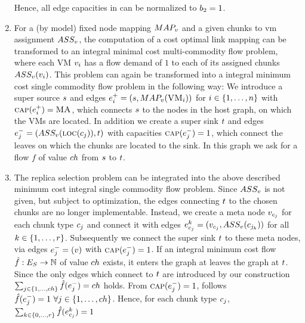 \begin{enumerate}
Hence, all edge capacities in can be normalized to $b_2 = 1$.
\item For a (by model) fixed node mapping $MAP_v$ and a given chunks to 
vm assignment $ASS_v$, the computation of a cost 
optimal link mapping can be transformed to an integral minimal cost multi-commodity 
flow problem, where each VM $v_i$ has a flow demand of $1$ to each 
of its assigned chunks $ASS_v(v_i)$. This problem can 
again be transformed into a integral minimum cost single commodity flow problem 
in the following way: 
We introduce a 
super source $s$ and edges $e_i^+ = (s, 
MAP_v(\textsc{VM}_i))$ for 
$i \in \{1,\dots,n\}$ with $\textsc{cap}(e_i^+) = \textsc{MA}$, 
which connects $s$ 
to the nodes in the host graph, on which the VMs are located. 
In addition we create a super sink $t$ and edges $e_j^- = 
(ASS_v(\textsc{loc}(c_j)), t)$ with capacities 
$\textsc{cap}(e_j^-) = 1$, which connect the leaves on which the 
chunks are located to the sink. In this graph we ask for a flow $f$ 
of value $ch$ from $s$ to $t$. 
\item The replica selection problem can be integrated into the above described 
minimum cost integral single commodity flow problem. Since $ASS_v$ 
is not given, but subject to optimization, the edges connecting $t$ to the 
chosen chunks are no longer implementable. Instead, we create a meta node 
$v_{c_j}$ for each chunk type 
$c_j$ and connect it with  edges 
$e_{c_j}^k = (v_{c_j}, 
ASS_v(c_{j_k}))$ for all $k \in 
\{1,\dots,r\}$. Subsequently we connect the super sink 
$t$ to these meta nodes, via 
edges $e_j^- = (v)$ with 
$\textsc{cap}(e_j^-) = 1$. If an integral minimum cost flow $\hat f 
: E_S \rightarrow \mathbb{N}$ of value $ch$ exists, it 
enters the graph at leaves the graph at $t$. Since the only 
edges which connect to $t$ are introduced by our construction $\sum_{j\in 
\{1,\dots,ch\}} \hat f(e_j^-) = ch$ holds. From 
$\textsc{cap}(e_j^-) = 1$, follows $\hat f(e_j^-) = 1 ~ 
\forall j \in \{1,\dots, ch\}$. Hence, for each chunk type $c_j$, 
$\sum_{k \in \{0,\dots,r\}}\hat f(e_{c_j}^k) = 1$ 

\end{enumerate}
